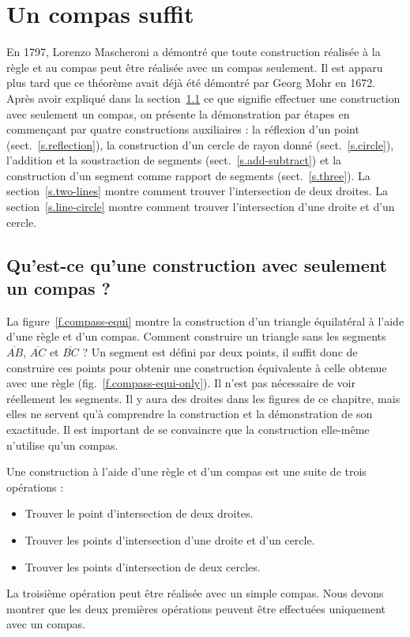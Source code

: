 \chapter{Un compas suffit}\label{c.compass}




En 1797, Lorenzo Mascheroni a démontré que toute construction réalisée à la règle et au  compas peut être réalisée avec un compas seulement. Il est apparu plus tard que ce théorème avait déjà été démontré par Georg Mohr en 1672. 
Après avoir expliqué dans la section~\ref{s.compass-what} ce que signifie effectuer une construction avec seulement un compas, on présente la démonstration par étapes en commençant par quatre constructions auxiliaires : la réflexion d'un point (sect.~\ref{s.reflection}), la construction d'un cercle de rayon donné (sect.~\ref{s.circle}), l'addition et la soustraction de segments  (sect.~\ref{s.add-subtract}) et la construction d'un segment  comme rapport de segments (sect.~\ref{s.three}). La section~\ref{s.two-lines} montre comment trouver l'intersection de deux droites. La section~\ref{s.line-circle} montre comment trouver l'intersection d'une droite et d'un cercle.

\section{Qu'est-ce qu'une construction avec seulement un compas ?}\label{s.compass-what}

La figure~\ref{f.compass-equi} montre la construction d'un triangle équilatéral à l'aide d'une règle et d'un compas. Comment construire un triangle sans les segments  $\overline{AB}$, $\overline{AC}$ et $\overline{BC}$ ? Un segment  est défini par deux points, il suffit donc de construire ces points pour obtenir une construction équivalente à celle obtenue avec une règle (fig.~\ref{f.compass-equi-only}). Il n'est pas nécessaire de voir réellement les segments.
Il y aura des droites dans les figures de ce chapitre, mais elles ne servent qu'à comprendre la construction et la démonstration  de son exactitude. Il est important de se convaincre que la construction elle-même n'utilise qu'un compas.


Une construction à l'aide d'une règle et d'un compas est une suite de trois opérations :
\begin{itemize}
\item Trouver le point d'intersection de deux droites.
\item Trouver les points d'intersection d'une droite et d'un cercle.
\item Trouver les points d'intersection de deux cercles.
\end{itemize}
La troisième opération peut être réalisée avec un simple compas. Nous devons montrer que les deux premières opérations peuvent être effectuées uniquement avec un compas. 

